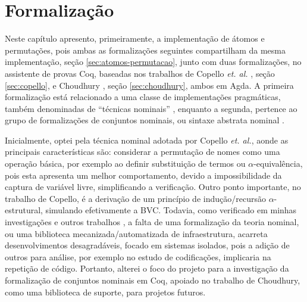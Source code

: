 \chapter{Formalização}\label{chp:formalizacao}

Neste capítulo apresento, primeiramente, a implementação de átomos e permutações, pois ambas as formalizações seguintes compartilham da mesma implementação, seção \ref{sec:atomos-permutacao}, junto com duas formalizações, no assistente de provas Coq, baseadas nos trabalhos de Copello \textit{et. al.} \cite{Copello2016}, seção \ref{sec:copello}, e Choudhury \cite{Choudhury2015}, seção \ref{sec:choudhury}, ambos em Agda. A primeira formalização está relacionado a uma classe de implementações pragmáticas, também denominadas de ``técnicas nominais'' \cite{Copello2016,Copello2018,Ambal2020,Tasistro2015,Aydemir2007}, enquanto a segunda, pertence ao grupo de formalizações de conjuntos nominais, ou sintaxe abstrata nominal \cite{AyalaRincon2019,Choudhury2015}.

Inicialmente, optei pela técnica nominal adotada por Copello \textit{et. al.}, aonde as principais características são: considerar a permutação de nomes como uma operação básica, por exemplo ao definir substituição de termos ou $\alpha$-equivalência, pois esta apresenta um melhor comportamento, devido a impossibilidade da captura de variável livre, simplificando a verificação. Outro ponto importante, no trabalho de Copello, é a derivação de um princípio de indução/recursão $\alpha$-estrutural, simulando efetivamente a BVC.
Todavia, como verificado em minhas investigações e outros trabalhos \cite{Aydemir2008}, a falta de uma formalização da teoria nominal, ou uma biblioteca mecanizada/automatizada de infraestrutura, acarreta desenvolvimentos desagradáveis, focado em sistemas isolados, pois a adição de outros para análise, por exemplo no estudo de codificações, implicaria na repetição de código. Portanto, alterei o foco do projeto para a investigação da formalização de conjuntos nominais em Coq, apoiado no trabalho de Choudhury, como uma biblioteca de suporte, para projetos futuros.



